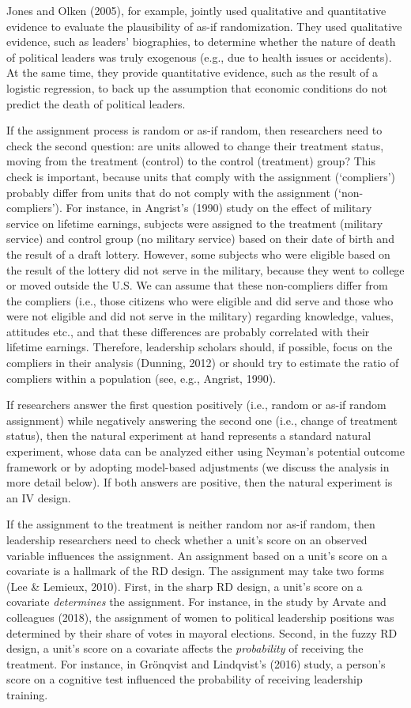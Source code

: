 \documentclass[english]{article}
\begin{document}
Jones and Olken (2005), for example, jointly used qualitative and
quantitative evidence to evaluate the plausibility of as-if
randomization. They used qualitative evidence, such as leaders'
biographies, to determine whether the nature of death of political
leaders was truly exogenous (e.g., due to health issues or accidents).
At the same time, they provide quantitative evidence, such as the result
of a logistic regression, to back up the assumption that economic
conditions do not predict the death of political leaders.

If the assignment process is random or as-if random, then researchers
need to check the second question: are units allowed to change their
treatment status, moving from the treatment (control) to the control
(treatment) group? This check is important, because units that comply
with the assignment (`compliers') probably differ from units that do not
comply with the assignment (`non-compliers'). For instance, in Angrist's
(1990) study on the effect of military service on lifetime earnings,
subjects were assigned to the treatment (military service) and control
group (no military service) based on their date of birth and the result
of a draft lottery. However, some subjects who were eligible based on
the result of the lottery did not serve in the military, because they
went to college or moved outside the U.S. We can assume that these
non-compliers differ from the compliers (i.e., those citizens who were
eligible and did serve and those who were not eligible and did not serve
in the military) regarding knowledge, values, attitudes etc., and that
these differences are probably correlated with their lifetime earnings.
Therefore, leadership scholars should, if possible, focus on the
compliers in their analysis (Dunning, 2012) or should try to estimate
the ratio of compliers within a population (see, e.g., Angrist, 1990).

If researchers answer the first question positively (i.e., random or
as-if random assignment) while negatively answering the second one
(i.e., change of treatment status), then the natural experiment at hand
represents a standard natural experiment, whose data can be analyzed
either using Neyman's potential outcome framework or by adopting
model-based adjustments (we discuss the analysis in more detail below).
If both answers are positive, then the natural experiment is an IV
design.

If the assignment to the treatment is neither random nor as-if random,
then leadership researchers need to check whether a unit's score on an
observed variable influences the assignment. An assignment based on a
unit's score on a covariate is a hallmark of the RD design. The
assignment may take two forms (Lee \& Lemieux, 2010). First, in the
sharp RD design, a unit's score on a covariate \emph{determines} the
assignment. For instance, in the study by Arvate and colleagues (2018),
the assignment of women to political leadership positions was determined
by their share of votes in mayoral elections. Second, in the fuzzy RD
design, a unit's score on a covariate affects the \emph{probability} of
receiving the treatment. For instance, in Grönqvist and Lindqvist's
(2016) study, a person's score on a cognitive test influenced the
probability of receiving leadership training.
\end{document}

